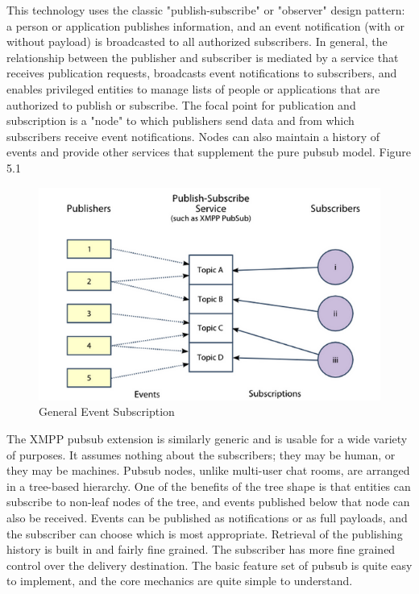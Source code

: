 This technology uses the classic "publish-subscribe" or "observer" design pattern: a person or application publishes information, and an event notification (with or without payload) is broadcasted to all authorized subscribers. In general, the relationship between the publisher and subscriber is mediated by a service that receives publication requests, broadcasts event notifications to subscribers, and enables privileged entities to manage lists of people or applications that are authorized to publish or subscribe. The focal point for publication and subscription is a "node" to which publishers send data and from which subscribers receive event notifications. Nodes can also maintain a history of events and provide other services that supplement the pure pubsub model. Figure 5.1
\begin{figure}[!ht]
    \centering
    \includegraphics[scale=0.8]{images/XEP0049.png}   
    \caption[General Event Subscription]{General Event Subscription}
    \label{img:pub_sub}                           
    \end{figure}

The XMPP pubsub extension is similarly generic and is usable for a wide variety of purposes. It assumes nothing about the subscribers; they may be human, or they may be machines. Pubsub nodes, unlike multi-user chat rooms, are arranged in a tree-based hierarchy. One of the benefits of the tree shape is that entities can subscribe to non-leaf nodes of the tree, and events published below that node can also be received. Events can be published as notifications or as full payloads, and the subscriber can choose which is most appropriate. 
Retrieval of the publishing history is built in and fairly fine grained. The subscriber has more fine grained control over the delivery destination. The basic feature set of pubsub is quite easy to implement, and the core mechanics are quite simple to understand.
   
